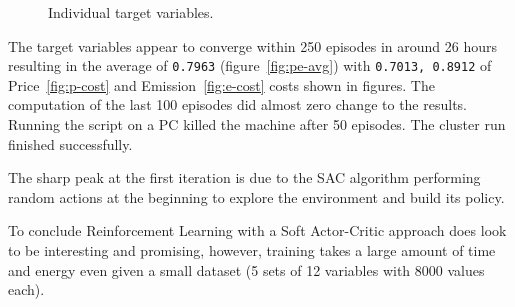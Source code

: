 \documentclass{article}
\numberwithin{equation}{subsection}
\begin{document}
	\begin{figure}[H]
		\centering	
		\caption{Individual target variables.}
	\end{figure}
	
The target variables appear to converge within 250 episodes in around 26 hours resulting in the average of \verb!0.7963! (figure~\ref{fig:pe-avg}) with \verb!0.7013, 0.8912! of Price~\ref{fig:p-cost} and Emission~\ref{fig:e-cost} costs shown in figures. The computation of the last 100 episodes did almost zero change to the results. Running the script on a PC killed the machine after 50 episodes. The cluster run finished successfully. 

The sharp peak at the first iteration is due to the SAC algorithm performing random actions at the beginning to explore the environment and build its policy. 

To conclude Reinforcement Learning with a Soft Actor-Critic approach does look to be interesting and promising, however, training takes a large amount of time and energy even given a small dataset (5 sets of 12 variables with 8000 values each). 


		



			 	
	 	
	 	


 
\end{document}
